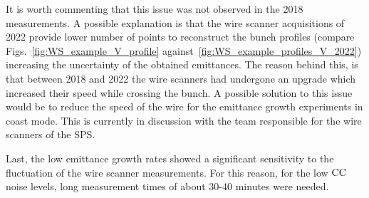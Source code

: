 It is worth commenting that this issue was not observed in the 2018 measurements. A possible explanation is that the wire scanner acquisitions of 2022 provide lower number of points to reconstruct the bunch profiles (compare Figs.~\ref{fig:WS_example_V_profile} against~\ref{fig:WS_example_profiles_V_2022}) increasing the uncertainty of the obtained emittances. The reason behind this, is that between 2018 and 2022 the wire scanners had undergone an upgrade which increased their speed while crossing the bunch. A possible solution to this issue would be to reduce the speed of the wire for the emittance growth experiments in coast mode. This is currently in discussion with the team responsible for the wire scanners of the SPS.


Last, the low emittance growth rates showed a significant sensitivity to the fluctuation of the wire scanner measurements. For this reason, for the low ${\mathrm{CC}}$ noise levels, long measurement times of about 30-40 minutes were needed.







